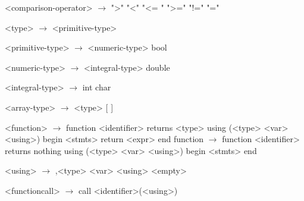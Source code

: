 \documentclass{article}
\begin{document}
\begin{grammar}
<comparison-operator> $\rightarrow$ ">"
				\alt "<"
				\alt "<= "
				\alt ">="
				\alt "!="
				\alt "="

<type> $\rightarrow$ <primitive-type>

<primitive-type> $\rightarrow$ <numeric-type>
\alt bool

<numeric-type> $\rightarrow$ <integral-type>
\alt double

<integral-type> $\rightarrow$ int
\alt char

<array-type> $\rightarrow$ <type> [ ]

<function> $\rightarrow$  function <identifier> returns <type> using (<type> <var> <using>)
begin
	<stmts>
	return <expr>
end
\alt function $\rightarrow$ function <identifier> returns nothing using (<type> <var> <using>)
begin
	<stmts>
end

<using> $\rightarrow$ ,<type> <var> <using>
\alt <empty>

<functioncall> $\rightarrow$ call <identifier>(<using>)

\end{grammar}
\end{document}
